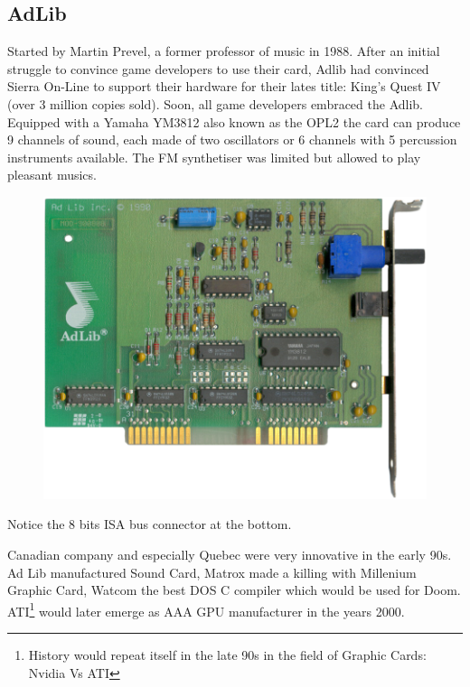 \documentclass[book.tex]{subfiles}
\begin{document}
  \subsection{AdLib}
  Started by Martin Prevel, a former professor of music in 1988. After an initial struggle to convince game developers to use their card, Adlib had convinced Sierra On-Line to support their hardware for their lates title: King's Quest IV (over 3 million copies sold). Soon, all game developers embraced the Adlib. Equipped with a Yamaha YM3812 also known as the OPL2 the card can produce 9 channels of sound, each made of two oscillators or 6 channels with 5 percussion instruments available. The FM synthetiser was limited but allowed to play pleasant musics.\\
  \begin{figure}[H] \centering \includegraphics[width=\textwidth]{imgs/hardware/adlib.png} \end{figure}
    Notice the 8 bits ISA bus connector at the bottom.
\par
{} Canadian company and especially Quebec were very innovative in the early 90s. Ad Lib manufactured Sound Card, Matrox made a killing with Millenium Graphic Card, Watcom the best DOS C compiler which would be used for Doom. ATI\footnote{History would repeat itself in the late 90s in the field of Graphic Cards: Nvidia Vs ATI} would later emerge as AAA GPU manufacturer in the years 2000.\\
  
  
\end{document}
